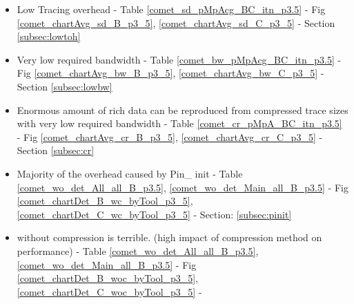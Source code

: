 \begin{itemize}
\item Low Tracing overhead - Table \ref{comet_sd_pMpAcg_BC_itn_p3.5} - Fig \ref{comet_chartAvg_sd_B_p3_5}, \ref{comet_chartAvg_sd_C_p3_5} - Section \ref{subsec:lowtoh}
\item Very low required bandwidth - Table \ref{comet_bw_pMpAcg_BC_itn_p3.5} - Fig \ref{comet_chartAvg_bw_B_p3_5}, \ref{comet_chartAvg_bw_C_p3_5} - Section \ref{subsec:lowbw}
\item Enormous amount of rich data can be reproduced from compressed trace sizes with very low required bandwidth - Table \ref{comet_cr_pMpA_BC_itn_p3.5} - Fig \ref{comet_chartAvg_cr_B_p3_5}, \ref{comet_chartAvg_cr_C_p3_5} - Section \ref{subsec:cr}
\item Majority of the overhead caused by Pin\_ init - Table \ref{comet_wo_det_All_all_B_p3.5}, \ref{comet_wo_det_Main_all_B_p3.5} - Fig \ref{comet_chartDet_B_wc_byTool_p3_5}, \ref{comet_chartDet_C_wc_byTool_p3_5} - Section: \ref{subsec:pinit}
\item \parlot without compression is terrible. (high impact of compression method on performance) - Table \ref{comet_wo_det_All_all_B_p3.5}, \ref{comet_wo_det_Main_all_B_p3.5}  - Fig \ref{comet_chartDet_B_woc_byTool_p3_5}, \ref{comet_chartDet_C_woc_byTool_p3_5} - \cite{subsec:compact}
\end{itemize}


